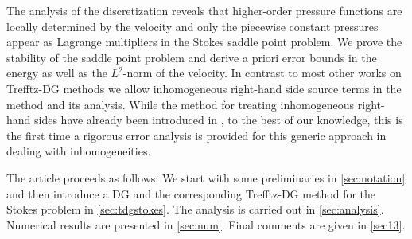 \documentclass[pdflatex,sn-mathphys,Numbered]{sn-jnl}%
\theoremstyle{remark}%
\theoremstyle{definition}%
\begin{document}
The analysis of the discretization reveals that higher-order pressure
functions are locally determined by the velocity and only the
piecewise constant pressures appear as Lagrange multipliers in the
Stokes saddle point problem. We prove the stability of the saddle point
problem and derive a priori error bounds in the energy as well as the
$L^2$-norm of the velocity. In contrast to most other works on
Trefftz-DG methods we allow inhomogeneous right-hand side source terms
in the method and its analysis. While the method for treating
inhomogeneous right-hand sides have already been introduced in
\cite{2201.07041}, to the best of our knowledge, this is the first
time a rigorous error analysis is provided for this generic approach
in dealing with inhomogeneities.

The article proceeds as follows: We start with some preliminaries in
\cref{sec:notation} and then introduce a DG and the corresponding
Trefftz-DG method for the Stokes problem in \cref{sec:tdgstokes}. The
analysis is carried out in \cref{sec:analysis}. Numerical results are
presented in \cref{sec:num}. Final comments are given in \cref{sec13}.
\end{document}

